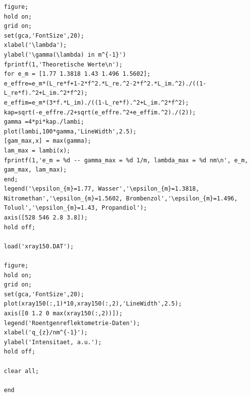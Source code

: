 \documentclass[numbers=noenddot,a4paper,notitlepage,twoside,BCOR15mm]{scrartcl}
\begin{document}
\begin{lstlisting}
figure;
hold on;
grid on;
set(gca,'FontSize',20);
xlabel('\lambda');
ylabel('\gamma(\lambda) in m^{-1}')
fprintf(1,'Theoretische Werte\n');
for e_m = [1.77 1.3818 1.43 1.496 1.5602];
e_effre=e_m*(L_re*f+1-2*f^2.*L_re.^2-2*f^2.*L_im.^2)./((1-L_re*f).^2+L_im.^2*f^2);
e_effim=e_m*(3*f.*L_im)./((1-L_re*f).^2+L_im.^2*f^2);
kap=sqrt(-e_effre./2+sqrt(e_effre.^2+e_effim.^2)./(2));
gamma =4*pi*kap./lambi;
plot(lambi,100*gamma,'LineWidth',2.5);
[gam_max,x] = max(gamma);
lam_max = lambi(x);
fprintf(1,'e_m = %d -- gamma_max = %d 1/m, lambda_max = %d nm\n', e_m, gam_max, lam_max); 
end;
legend('\epsilon_{m}=1.77, Wasser','\epsilon_{m}=1.3818, Nitromethan','\epsilon_{m}=1.5602, Brombenzol','\epsilon_{m}=1.496, Toluol','\epsilon_{m}=1.43, Propandiol');
axis([528 546 2.8 3.8]);
hold off;

load('xray150.DAT');

figure;
hold on;
grid on;
set(gca,'FontSize',20);
plot(xray150(:,1)*10,xray150(:,2),'LineWidth',2.5);
axis([0 1.2 0 max(xray150(:,2))]);
legend('Roentgenreflektometrie-Daten');
xlabel('q_{z}/nm^{-1}');
ylabel('Intensitaet, a.u.');
hold off;

clear all;

end
\end{lstlisting}
\end{document}

